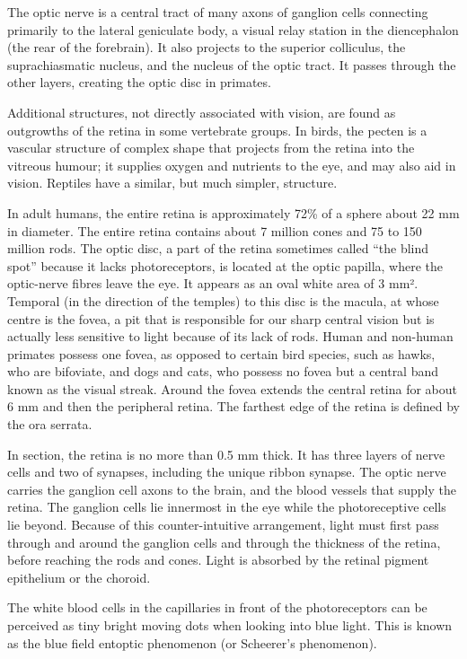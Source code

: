 \documentclass[]{book}
\begin{document}
The optic nerve is a central tract of many axons of ganglion cells connecting primarily to the lateral geniculate body, a visual relay station in the diencephalon (the rear of the forebrain). It also projects to the superior colliculus, the suprachiasmatic nucleus, and the nucleus of the optic tract. It passes through the other layers, creating the optic disc in primates.

Additional structures, not directly associated with vision, are found as outgrowths of the retina in some vertebrate groups. In birds, the pecten is a vascular structure of complex shape that projects from the retina into the vitreous humour; it supplies oxygen and nutrients to the eye, and may also aid in vision. Reptiles have a similar, but much simpler, structure.

In adult humans, the entire retina is approximately 72\% of a sphere about 22 mm in diameter. The entire retina contains about 7 million cones and 75 to 150 million rods. The optic disc, a part of the retina sometimes called ``the blind spot'' because it lacks photoreceptors, is located at the optic papilla, where the optic-nerve fibres leave the eye. It appears as an oval white area of 3 mm². Temporal (in the direction of the temples) to this disc is the macula, at whose centre is the fovea, a pit that is responsible for our sharp central vision but is actually less sensitive to light because of its lack of rods. Human and non-human primates possess one fovea, as opposed to certain bird species, such as hawks, who are bifoviate, and dogs and cats, who possess no fovea but a central band known as the visual streak. Around the fovea extends the central retina for about 6 mm and then the peripheral retina. The farthest edge of the retina is defined by the ora serrata.

In section, the retina is no more than 0.5 mm thick. It has three layers of nerve cells and two of synapses, including the unique ribbon synapse. The optic nerve carries the ganglion cell axons to the brain, and the blood vessels that supply the retina. The ganglion cells lie innermost in the eye while the photoreceptive cells lie beyond. Because of this counter-intuitive arrangement, light must first pass through and around the ganglion cells and through the thickness of the retina, before reaching the rods and cones. Light is absorbed by the retinal pigment epithelium or the choroid.

The white blood cells in the capillaries in front of the photoreceptors can be perceived as tiny bright moving dots when looking into blue light. This is known as the blue field entoptic phenomenon (or Scheerer's phenomenon).
\end{document}
